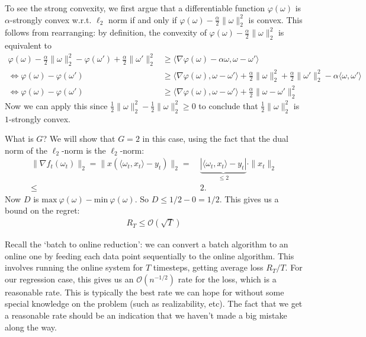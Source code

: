 \documentclass[11pt]{article}
\begin{document}
To see the strong convexity, we first argue that a differentiable function $\varphi(\omega)$ is $\alpha$-strongly convex w.r.t. $\ell_2$ norm if and only if $\varphi(\omega) - \frac{\alpha}{2} \|\omega\|_2^2$ is convex. This follows from rearranging: by definition, the convexity of $\varphi(\omega) - \frac{\alpha}{2}\|\omega\|_2^2$ is equivalent to
\begin{align*}
	\varphi(\omega) - \frac{\alpha}{2} \|\omega\|_2^2 - \varphi(\omega') + \frac{\alpha}{2} \|\omega'\|_2^2 &\ge \langle \nabla \varphi(\omega) - \alpha \omega, \omega - \omega' \rangle \\
	\Leftrightarrow \varphi(\omega) - \varphi(\omega')  &\ge \langle \nabla \varphi(\omega), \omega - \omega' \rangle + \frac{\alpha}{2} \|\omega\|_2^2 +  \frac{\alpha}{2} \|\omega'\|_2^2 - \alpha \langle \omega, \omega' \rangle \\
	\Leftrightarrow \varphi(\omega) - \varphi(\omega')  &\ge \langle \nabla \varphi(\omega), \omega - \omega' \rangle + \frac{\alpha}{2} \|\omega - \omega'\|_2^2
\end{align*} 
Now we can apply this since $\tfrac{1}{2}\|\omega\|_2^2 - \tfrac{1}{2}\|\omega\|_2^2 \geq 0$ to conclude that $\frac{1}{2}\|\omega\|_2^2$ is $1$-strongly convex. 

What is \(G\)? We will show that \(G = 2\) in this case, using the fact that the dual norm of the \(\ell_2\)-norm is the \(\ell_2\)-norm:
\begin{equation}
\begin{split}
    \|\nabla f_t(\omega_t)\|_2 = \|x(\langle \omega_t, x_t\rangle - y_t)\|_2 = & \ \underbrace{|\langle\omega_t, x_t\rangle - y_t|}_{\leq 2}\cdot \|x_t\|_2\\
    \leq & \ 2. 
\end{split}
\end{equation}
Now \(D\) is \(\mathrm{max} \ \varphi(\omega) - \mathrm{min} \ \varphi(\omega)\). So \(D \leq 1/2 - 0 = 1 /2\). This gives us a bound on the regret:
\begin{align}
    R_T \leq \mathcal{O}\left(\sqrt{T}\right)
\end{align}

Recall the `batch to online reduction': we can convert a batch algorithm to an online one by feeding each data point sequentially to the online algorithm. This involves running the online system for \(T\) timesteps, getting average loss \(R_T / T\). For our regression case, this gives us an \(\mathcal{O}\left(n^{-1/2}\right)\) rate for the loss, which is a reasonable rate. This is typically the best rate we can hope for without some special knowledge on the problem (such as realizability, etc). The fact that we get a reasonable rate should be an indication that we haven't made a big mistake along the way. 
\end{document}
